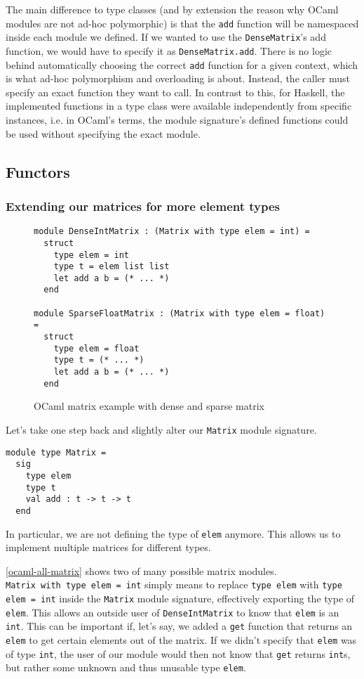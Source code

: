 The main difference to type classes (and by extension the reason why OCaml modules are not ad-hoc polymorphic) is that the \verb|add| function will be namespaced inside each module we defined. If we wanted to use the \verb|DenseMatrix|'s add function, we would have to specify it as \verb|DenseMatrix.add|. There is no logic behind automatically choosing the correct \verb|add| function for a given context, which is what ad-hoc polymorphism and overloading is about. Instead, the caller must specify an exact function they want to call. In contrast to this, for Haskell, the implemented functions in a type class were available independently from specific instances, i.e. in OCaml's terms, the module signature's defined functions could be used without specifying the exact module.

\subsection{Functors}

\subsubsection{Extending our matrices for more element types}

\begin{figure*}
\begin{verbatim}
module DenseIntMatrix : (Matrix with type elem = int) =
  struct
    type elem = int
    type t = elem list list
    let add a b = (* ... *)
  end

module SparseFloatMatrix : (Matrix with type elem = float) =
  struct
    type elem = float
    type t = (* ... *)
    let add a b = (* ... *)
  end
\end{verbatim}
\caption{OCaml matrix example with dense and sparse matrix}
\label{ocaml-all-matrix}
\end{figure*}

Let's take one step back and slightly alter our \verb|Matrix| module signature.
\begin{verbatim}
module type Matrix =
  sig
    type elem
    type t
    val add : t -> t -> t
  end
\end{verbatim}
In particular, we are not defining the type of \verb|elem| anymore. This allows us to implement multiple matrices for different types.

\autoref{ocaml-all-matrix} shows two of many possible matrix modules. \\ \verb|Matrix with type elem = int| simply means to replace \verb|type elem| with \verb|type elem = int| inside the \verb|Matrix| module signature, effectively exporting the type of \verb|elem|. This allows an outside user of \verb|DenseIntMatrix| to know that \verb|elem| is an \verb|int|. This can be important if, let's say, we added a \verb|get| function that returns an \verb|elem| to get certain elements out of the matrix. If we didn't specify that \verb|elem| was of type \verb|int|, the user of our module would then not know that \verb|get| returns \verb|int|s, but rather some unknown and thus unusable type \verb|elem|.

